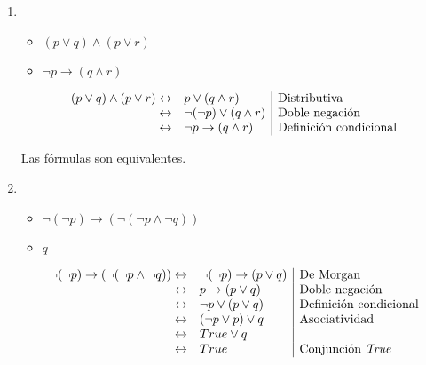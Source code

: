 \begin{enumerate}[label=\alph*)]
    \item \begin{itemize}
              \item $(p \lor q) \land (p \lor r)$
              \item $\neg p \to (q \land r)$
          \end{itemize}

          \[
              \begin{array}{rl|l}
                  (p \lor q) \land (p \lor r) \leftrightarrow & p \lor (q \land r)             & \text{Distributiva}           \\
                  \leftrightarrow                             & \neg (\neg p) \lor (q \land r) & \text{Doble negación}         \\
                  \leftrightarrow                             & \neg p \to (q \land r)         & \text{Definición condicional}
              \end{array}
          \]

          Las fórmulas son equivalentes.

    \item \begin{itemize}
              \item $\neg (\neg p) \to (\neg (\neg p \land \neg q))$
              \item $q$

          \end{itemize}

          \[
              \begin{array}{rl|l}
                  \neg (\neg p) \to (\neg (\neg p \land \neg q)) \leftrightarrow & \neg (\neg p) \to (p \lor q) & \text{De Morgan}                \\
                  \leftrightarrow                                                & p \to (p \lor q)             & \text{Doble negación}           \\
                  \leftrightarrow                                                & \neg p \lor (p \lor q)       & \text{Definición condicional}   \\
                  \leftrightarrow                                                & (\neg p \lor p) \lor q       & \text{Asociatividad}            \\
                  \leftrightarrow                                                & True \lor q                                                    \\
                  \leftrightarrow                                                & True                         & \text{Conjunción \textit{True}}
              \end{array}
          \]


\end{enumerate}
